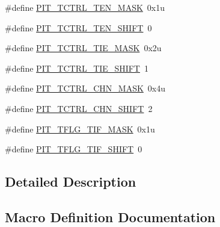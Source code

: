 \begin{DoxyCompactItemize}
\#define \hyperlink{group___p_i_t___register___masks_ga1099670711f996f5fa84e33bbfe794b2}{P\+I\+T\+\_\+\+T\+C\+T\+R\+L\+\_\+\+T\+E\+N\+\_\+\+M\+A\+SK}~0x1u
\item 
\#define \hyperlink{group___p_i_t___register___masks_ga0080137ff0378087f08cc12fd10b3e1f}{P\+I\+T\+\_\+\+T\+C\+T\+R\+L\+\_\+\+T\+E\+N\+\_\+\+S\+H\+I\+FT}~0
\item 
\#define \hyperlink{group___p_i_t___register___masks_ga99639aabcac1d6042d14e7893d00bf67}{P\+I\+T\+\_\+\+T\+C\+T\+R\+L\+\_\+\+T\+I\+E\+\_\+\+M\+A\+SK}~0x2u
\item 
\#define \hyperlink{group___p_i_t___register___masks_gae21aee9e81741a924c9f2824fbc5775b}{P\+I\+T\+\_\+\+T\+C\+T\+R\+L\+\_\+\+T\+I\+E\+\_\+\+S\+H\+I\+FT}~1
\item 
\#define \hyperlink{group___p_i_t___register___masks_ga734e2e947c649d50b9ca46405e451c2b}{P\+I\+T\+\_\+\+T\+C\+T\+R\+L\+\_\+\+C\+H\+N\+\_\+\+M\+A\+SK}~0x4u
\item 
\#define \hyperlink{group___p_i_t___register___masks_ga9a1c8aa25a05c9b2c9503a003fa8d24d}{P\+I\+T\+\_\+\+T\+C\+T\+R\+L\+\_\+\+C\+H\+N\+\_\+\+S\+H\+I\+FT}~2
\item 
\#define \hyperlink{group___p_i_t___register___masks_ga9de8d708b43c9ca35df26c7b43f09769}{P\+I\+T\+\_\+\+T\+F\+L\+G\+\_\+\+T\+I\+F\+\_\+\+M\+A\+SK}~0x1u
\item 
\#define \hyperlink{group___p_i_t___register___masks_gaf6f5ddca2193ed04bc61bc3e899f5ced}{P\+I\+T\+\_\+\+T\+F\+L\+G\+\_\+\+T\+I\+F\+\_\+\+S\+H\+I\+FT}~0
\end{DoxyCompactItemize}


\subsection{Detailed Description}


\subsection{Macro Definition Documentation}
\mbox{\label{group___p_i_t___register___masks_ga00291ae8d045c0b0f199d8950c7e453a}} 
